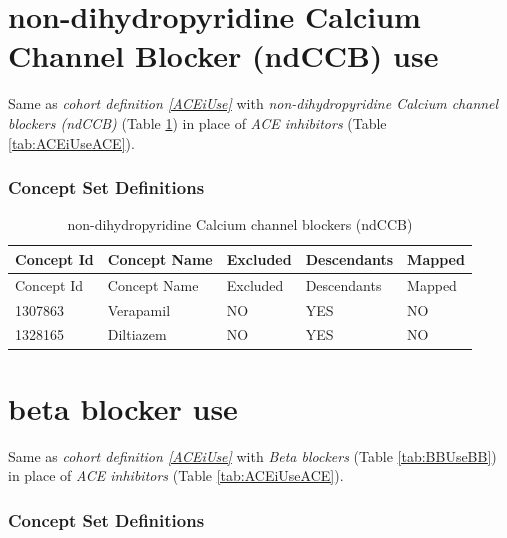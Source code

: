 \documentclass[11pt]{book}
\theoremstyle{definition}
\theoremstyle{definition}
\theoremstyle{definition}
\theoremstyle{remark}
\begin{document}
\hypertarget{ndCCBUse}{%
\section{non-dihydropyridine Calcium Channel Blocker (ndCCB) use}\label{ndCCBUse}}

Same as \emph{cohort definition \ref{ACEiUse}} with \emph{non-dihydropyridine Calcium channel blockers (ndCCB)} (Table \ref{tab:ndCCBUsendCCB}) in place of \emph{ACE inhibitors} (Table \ref{tab:ACEiUseACE}).

\hypertarget{concept-set-definitions-10}{%
\subsubsection*{Concept Set Definitions}\label{concept-set-definitions-10}}

\begin{longtable}[]{@{}lllll@{}}
\caption{\label{tab:ndCCBUsendCCB} non-dihydropyridine Calcium channel blockers (ndCCB)}\tabularnewline
\toprule
Concept Id & Concept Name & Excluded & Descendants & Mapped\tabularnewline
\midrule
\endfirsthead
\toprule
Concept Id & Concept Name & Excluded & Descendants & Mapped\tabularnewline
\midrule
\endhead
1307863 & Verapamil & NO & YES & NO\tabularnewline
1328165 & Diltiazem & NO & YES & NO\tabularnewline
\bottomrule
\end{longtable}

\hypertarget{BBUse}{%
\section{beta blocker use}\label{BBUse}}

Same as \emph{cohort definition \ref{ACEiUse}} with \emph{Beta blockers} (Table \ref{tab:BBUseBB}) in place of \emph{ACE inhibitors} (Table \ref{tab:ACEiUseACE}).

\hypertarget{concept-set-definitions-11}{%
\subsubsection*{Concept Set Definitions}\label{concept-set-definitions-11}}
\end{document}

